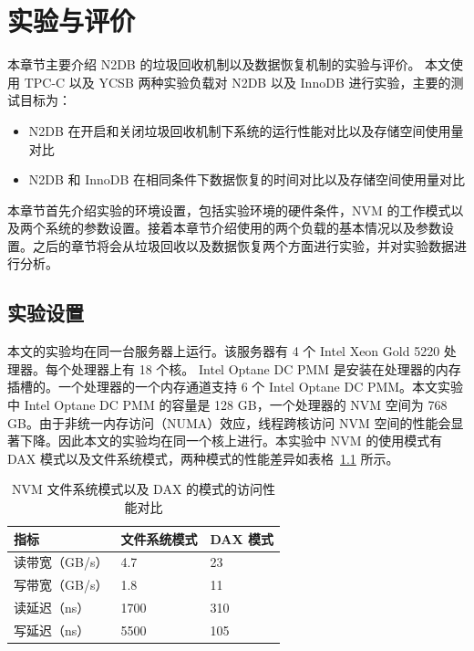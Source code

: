 
\chapter{实验与评价}

本章节主要介绍 N2DB 的垃圾回收机制以及数据恢复机制的实验与评价。
本文使用 TPC-C 以及 YCSB 两种实验负载对 N2DB 以及 InnoDB 进行实验，主要的测试目标为：
\begin{itemize}
    \item N2DB 在开启和关闭垃圾回收机制下系统的运行性能对比以及存储空间使用量对比
    \item N2DB 和 InnoDB 在相同条件下数据恢复的时间对比以及存储空间使用量对比
\end{itemize}

本章节首先介绍实验的环境设置，包括实验环境的硬件条件，NVM 的工作模式以及两个系统的参数设置。接着本章节介绍使用的两个负载的基本情况以及参数设置。之后的章节将会从垃圾回收以及数据恢复两个方面进行实验，并对实验数据进行分析。

\section{实验设置}

本文的实验均在同一台服务器上运行。该服务器有 4 个 Intel Xeon Gold 5220 处理器。每个处理器上有 18 个核。
Intel Optane DC PMM 是安装在处理器的内存插槽的。一个处理器的一个内存通道支持 6 个 Intel Optane DC PMM。本文实验中 Intel Optane DC PMM 的容量是 128 GB，一个处理器的 NVM 空间为 768 GB。由于非统一内存访问（NUMA）效应，线程跨核访问 NVM 空间的性能会显著下降。因此本文的实验均在同一个核上进行。本实验中 NVM 的使用模式有 DAX 模式以及文件系统模式，两种模式的性能差异如表格~\ref{tab:nvm-metric} 所示。

\begin{table}
    \centering
    \caption{NVM 文件系统模式以及 DAX 的模式的访问性能对比}
    \begin{tabular}{lll}
        \toprule
        指标           & 文件系统模式 & DAX 模式 \\
        \midrule
        读带宽（GB/s） & 4.7          & 23       \\
        写带宽（GB/s） & 1.8          & 11       \\
        读延迟（ns）   & 1700         & 310      \\
        写延迟（ns）   & 5500         & 105      \\
        \bottomrule
    \end{tabular}
    \label{tab:nvm-metric}
\end{table}

